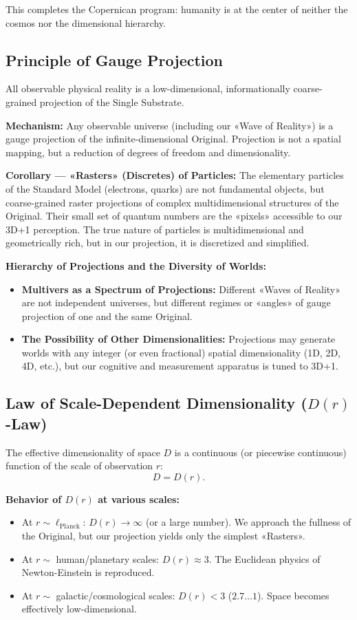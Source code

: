 \documentclass[a4paper,12pt]{article}
\begin{document}
	This completes the Copernican program: humanity is at the center of neither the cosmos nor the dimensional hierarchy.
	
	\subsection{Principle of Gauge Projection}
	
	All observable physical reality is a low-dimensional, informationally coarse-grained projection of the Single Substrate.
	
	\textbf{Mechanism:} Any observable universe (including our «Wave of Reality») is a gauge projection of the infinite-dimensional Original. Projection is not a spatial mapping, but a reduction of degrees of freedom and dimensionality.
	
	\textbf{Corollary — «Rasters» (Discretes) of Particles:} The elementary particles of the Standard Model (electrons, quarks) are not fundamental objects, but coarse-grained raster projections of complex multidimensional structures of the Original. Their small set of quantum numbers are the «pixels» accessible to our 3D+1 perception. The true nature of particles is multidimensional and geometrically rich, but in our projection, it is discretized and simplified.
	
	\textbf{Hierarchy of Projections and the Diversity of Worlds:}
	\begin{itemize}
		\item \textbf{Multivers as a Spectrum of Projections:} Different «Waves of Reality» are not independent universes, but different regimes or «angles» of gauge projection of one and the same Original.
		\item \textbf{The Possibility of Other Dimensionalities:} Projections may generate worlds with any integer (or even fractional) spatial dimensionality (1D, 2D, 4D, etc.), but our cognitive and measurement apparatus is tuned to 3D+1.
	\end{itemize}
	
	\subsection{Law of Scale-Dependent Dimensionality ($D(r)$-Law)}
	
	The effective dimensionality of space $D$ is a continuous (or piecewise continuous) function of the scale of observation $r$:
	\[
	D = D(r).
	\]
	
	\textbf{Behavior of $D(r)$ at various scales:}
	\begin{itemize}
		\item At $r \sim \ell_{\text{Planck}}$: $D(r) \to \infty$ (or a large number). We approach the fullness of the Original, but our projection yields only the simplest «Rasters».
		\item At $r \sim$ human/planetary scales: $D(r) \approx 3$. The Euclidean physics of Newton-Einstein is reproduced.
		\item At $r \sim$ galactic/cosmological scales: $D(r) < 3$ ($2.7 \dots 1$). Space becomes effectively low-dimensional.
	\end{itemize}
	
\end{document}
